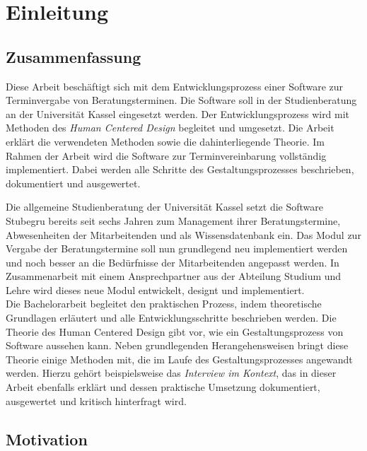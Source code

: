 \chapter{Einleitung}
\label{chapter:introduction}

\section{Zusammenfassung}
Diese Arbeit beschäftigt sich mit dem Entwicklungsprozess einer Software zur
Terminvergabe von Beratungsterminen. Die Software soll in der Studienberatung
an der Universität Kassel eingesetzt werden. Der Entwicklungsprozess wird mit
Methoden des \textit{Human Centered Design} begleitet und umgesetzt. Die
Arbeit erklärt die verwendeten Methoden sowie die dahinterliegende Theorie. Im
Rahmen der Arbeit wird die Software zur Terminvereinbarung vollständig
implementiert. Dabei werden alle Schritte des Gestaltungsprozesses beschrieben,
dokumentiert und ausgewertet.

Die allgemeine Studienberatung der Universität Kassel setzt die Software
Stubegru bereits seit sechs Jahren zum Management ihrer Beratungstermine,
Abwesenheiten der Mitarbeitenden und als Wissensdatenbank ein. Das Modul zur Vergabe der
Beratungstermine soll nun grundlegend neu implementiert werden und noch besser
an die Bedürfnisse der Mitarbeitenden angepasst werden. In Zusammenarbeit mit
einem Ansprechpartner aus der Abteilung Studium und Lehre wird dieses neue
Modul entwickelt, designt und implementiert.\\ Die Bachelorarbeit begleitet
den praktischen Prozess, indem theoretische Grundlagen erläutert und
alle Entwicklungsschritte beschrieben werden. Die Theorie des Human Centered
Design gibt vor, wie ein Gestaltungsprozess von Software aussehen kann. Neben
grundlegenden Herangehensweisen bringt diese Theorie einige Methoden mit, die
im Laufe des Gestaltungsprozesses angewandt werden. Hierzu gehört
beispielsweise das \textit{Interview im Kontext}, das in dieser Arbeit
ebenfalls erklärt und dessen praktische Umsetzung dokumentiert,
ausgewertet und kritisch hinterfragt wird.

\section{Motivation}

